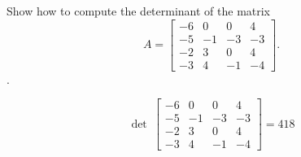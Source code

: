 
\begin{exerciseStatement}


Show how to compute the determinant of the matrix \[A= \left[\begin{array}{cccc}
-6 & 0 & 0 & 4 \\
-5 & -1 & -3 & -3 \\
-2 & 3 & 0 & 4 \\
-3 & 4 & -1 & -4
\end{array}\right] .\].


\end{exerciseStatement}
    
\begin{exerciseAnswer} 
\[\operatorname{det}\  \left[\begin{array}{cccc}
-6 & 0 & 0 & 4 \\
-5 & -1 & -3 & -3 \\
-2 & 3 & 0 & 4 \\
-3 & 4 & -1 & -4
\end{array}\right] = 418 \]
\end{exerciseAnswer}
    
